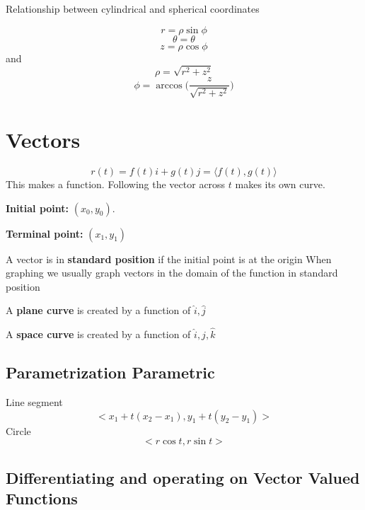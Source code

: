 Relationship between cylindrical and spherical coordinates

\begin{equation}
	\label{}
r=\rho\sin\phi
\end{equation}
\begin{equation}
	\label{}
\theta=\theta	
\end{equation}
\begin{equation}
	\label{}
z=\rho\cos\phi	
\end{equation}
and
\begin{equation}
	\label{}
	\rho=\sqrt{r^{2}+z^{2}}
\end{equation}
\begin{equation}
	\label{}
	\phi=\arccos\big(\frac{z}{\sqrt{r^{2}+z^{2}}}\big)	
\end{equation}

\section{Vectors}
\begin{equation}
	\label{}
r(t)=f(t)i+g(t)j= \langle f(t),g(t)\rangle
\end{equation}
This makes a function. Following the vector across $t$ makes its own curve.

\textbf{Initial point:} $(x_{0},y_{0})$.


\textbf{Terminal point:} $(x_{1},y_{1})$

A vector is in \textbf{standard position} if the initial point is at the origin When graphing we usually graph vectors in the domain of the function in standard position


A \textbf{plane curve} is created by a function of $\hat{i},\hat{j}$

A \textbf{space curve} is created by a function of $\hat{i},\hat{j},\hat{k}$


\subsection{Parametrization Parametric}
Line segment
\begin{equation}
	\label{}
	<x_{1}+t(x_{2}-x_{1}),y_{1}+t(y_{2}-y_{1})>	
\end{equation}
Circle
\begin{equation}
	\label{}
<r\cos t,r\sin t>	
\end{equation}


\subsection{Differentiating and operating on Vector Valued Functions}

